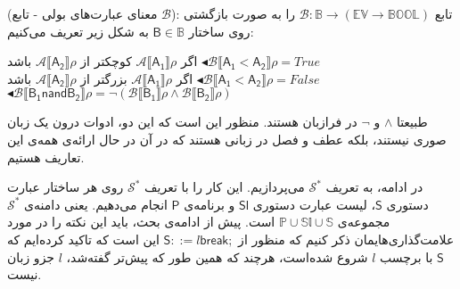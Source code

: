 \begin{defn}
	(معنای عبارت‌های بولی - تابع $\mathcal{B}$): تابع 
	$\mathcal{B}: \mathbb{B} \rightarrow (\mathbb{EV} \rightarrow \mathbb{BOOL})$
	را به صورت بازگشتی روی ساختار 
	$\mathsf{B} \in \mathbb{B}$
	به شکل زیر تعریف می‌کنیم:
	
	\begin{center}
		اگر $\mathcal{A\llbracket\mathsf{A_1}\rrbracket\rho }$ کوچکتر از $\mathcal{A\llbracket\mathsf{A_2}\rrbracket\rho }$ باشد
		$\blacktriangleleft\mathcal{B\llbracket\mathsf{A_1<A_2}\rrbracket\rho = } True   \hspace{2cm}  $\\
		اگر $\mathcal{A\llbracket\mathsf{A_1}\rrbracket\rho }$ بزرگتر از $\mathcal{A\llbracket\mathsf{A_2}\rrbracket\rho }$ باشد
		$\blacktriangleleft\mathcal{B\llbracket\mathsf{A_1<A_2}\rrbracket\rho = } False   \hspace{2cm}  $\\
		$ \blacktriangleleft\mathcal{B\llbracket\mathsf{B_1 nand B_2}\rrbracket\rho = } \neg(\mathcal{B\llbracket\mathsf{B_1}\rrbracket\rho}   \wedge \mathcal{B\llbracket\mathsf{B_2}\rrbracket\rho}) $
	\end{center}

طبیعتا $\wedge$ و $\neg$ در فرازبان هستند. منظور این است که این دو، ادوات درون یک زبان صوری نیستند، بلکه عطف و فصل در زبانی هستند که در آن در حال ارائه‌ی همه‌ی این تعاریف هستیم.
\end{defn}

در ادامه، به تعریف $\mathcal{S^*}$ می‌پردازیم. این کار را با تعریف $\mathcal{S^*}$ روی هر ساختار عبارت دستوری $\mathsf{S}$، لیست عبارت دستوری $\mathsf{Sl}$ و برنامه‌ی $\mathsf{P}$ انجام می‌دهیم. یعنی دامنه‌ی $\mathcal{S}^*$ مجموعه‌ی $\mathbb{P}\cup \mathbb{Sl}\cup\mathbb{S}$ است.
پیش از ادامه‌ی بحث، باید این نکته را در‌ مورد علامت‌گذاری‌هایمان ذکر کنیم که منظور از $        \mathsf{S} ::= l \mathsf{break;}  $ این است که تاکید کرده‌ایم که $\mathsf{S}$ با برچسب $l$ شروع شده‌است، هرچند که همین طور که پیش‌تر گفته‌شد،   $l$ جزو زبان نیست.

